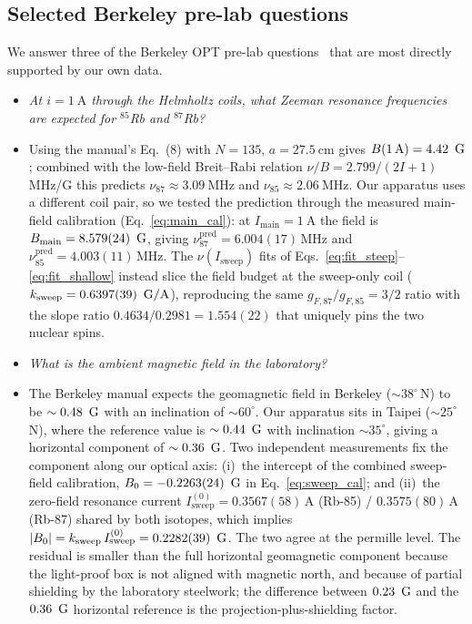 \subsection*{Selected Berkeley pre-lab questions}
We answer three of the Berkeley OPT pre-lab questions~\cite{OPTOpticalPumping2024}
that are most directly supported by our own data.
\begin{itemize}
    \item[Q15.] \emph{At $i = \SI{1}{\ampere}$ through the Helmholtz coils, what Zeeman resonance frequencies are expected for $^{85}$Rb and $^{87}$Rb?}
    \item[A15.] Using the manual's Eq.~(8) with $N = 135$, $a = \SI{27.5}{\centi\meter}$ gives $B(\SI{1}{\ampere}) = \SI{4.42}{\gauss}$; combined with the low-field Breit--Rabi relation $\nu/B = 2.799/(2I+1)$ MHz/G this predicts $\nu_{87} \approx \SI{3.09}{\mega\hertz}$ and $\nu_{85} \approx \SI{2.06}{\mega\hertz}$. Our apparatus uses a different coil pair, so we tested the prediction through the measured main-field calibration (Eq.~\ref{eq:main_cal}): at $I_{\mathrm{main}} = \SI{1}{\ampere}$ the field is $B_{\mathrm{main}} = 8.579(24)\,\si{\gauss}$, giving $\nu_{87}^{\mathrm{pred}} = 6.004(17)\,\si{\mega\hertz}$ and $\nu_{85}^{\mathrm{pred}} = 4.003(11)\,\si{\mega\hertz}$. The $\nu(I_{\mathrm{sweep}})$ fits of Eqs.~\ref{eq:fit_steep}--\ref{eq:fit_shallow} instead slice the field budget at the sweep-only coil ($k_{\mathrm{sweep}} = 0.6397(39)\,\si{\gauss\per\ampere}$), reproducing the same $g_{F,87}/g_{F,85} = 3/2$ ratio with the slope ratio $0.4634/0.2981 = 1.554(22)$ that uniquely pins the two nuclear spins.
    \item[Q16.] \emph{What is the ambient magnetic field in the laboratory?}
    \item[A16.] The Berkeley manual expects the geomagnetic field in Berkeley ($\sim 38^\circ$\,N) to be $\sim\SI{0.48}{\gauss}$ with an inclination of $\sim 60^\circ$. Our apparatus sits in Taipei ($\sim 25^\circ$\,N), where the reference value is $\sim\SI{0.44}{\gauss}$ with inclination $\sim 35^\circ$, giving a horizontal component of $\sim\SI{0.36}{\gauss}$. Two independent measurements fix the component along our optical axis: (i)~the intercept of the combined sweep-field calibration, $B_0 = -0.2263(24)\,\si{\gauss}$ in Eq.~\ref{eq:sweep_cal}; and (ii)~the zero-field resonance current $I_{\mathrm{sweep}}^{(0)} = 0.3567(58)\,\si{\ampere}$ (Rb-85) / $0.3575(80)\,\si{\ampere}$ (Rb-87) shared by both isotopes, which implies $|B_0| = k_{\mathrm{sweep}}\,I_{\mathrm{sweep}}^{(0)} = 0.2282(39)\,\si{\gauss}$. The two agree at the permille level. The residual is smaller than the full horizontal geomagnetic component because the light-proof box is not aligned with magnetic north, and because of partial shielding by the laboratory steelwork; the difference between $\SI{0.23}{\gauss}$ and the $\SI{0.36}{\gauss}$ horizontal reference is the projection-plus-shielding factor.

\end{itemize}
